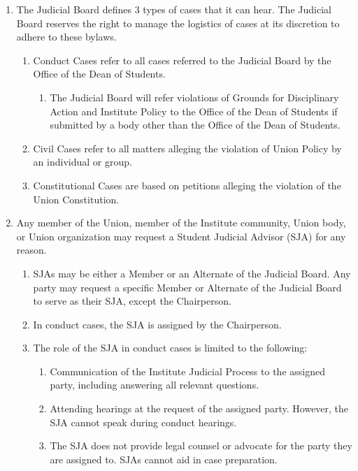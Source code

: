 \begin{enumerate}
  \item The Judicial Board defines 3 types of cases that it can hear. The Judicial Board reserves the right to manage the logistics of cases at its discretion to adhere to these bylaws.
    \begin{enumerate}
      \item Conduct Cases refer to all cases referred to the Judicial Board by the Office of the Dean of Students.
        \begin{enumerate}
          \item The Judicial Board will refer violations of Grounds for Disciplinary Action and Institute Policy to the Office of the Dean of Students if submitted by a body other than the Office of the Dean of Students.
        \end{enumerate}
      \item Civil Cases refer to all matters alleging the violation of Union Policy by an individual or group.
      \item Constitutional Cases are based on petitions alleging the violation of the Union Constitution.
    \end{enumerate}
  \item Any member of the Union, member of the Institute community, Union body, or Union organization may request a Student Judicial Advisor (SJA) for any reason.
    \begin{enumerate}
      \item SJAs may be either a Member or an Alternate of the Judicial Board. Any party may request a specific Member or Alternate of the Judicial Board to serve as their SJA, except the Chairperson.
      \item In conduct cases, the SJA is assigned by the Chairperson.
      \item The role of the SJA in conduct cases is limited to the following:
        \begin{enumerate}
          \item Communication of the Institute Judicial Process to the assigned party, including answering all relevant questions.
          \item Attending hearings at the request of the assigned party. However, the SJA cannot speak during conduct hearings.
          \item The SJA does not provide legal counsel or advocate for the party they are assigned to. SJAs cannot aid in case preparation.

\end{enumerate}
\end{enumerate}
\end{enumerate}
